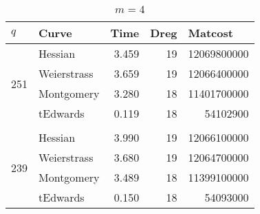 \begin{table}[!h]
\centering
\caption{$m=4$}
\label{tb:m=4}
\begin{tabular}{llrrr}
\hline
\multicolumn{1}{|l|}{$q$}                  & \multicolumn{1}{l|}{Curve}       & \multicolumn{1}{l|}{Time}  & \multicolumn{1}{l|}{Dreg} & \multicolumn{1}{l|}{Matcost}     \\ \hline
\multicolumn{1}{|l|}{\multirow{4}{*}{251}} & \multicolumn{1}{l|}{Hessian}     & \multicolumn{1}{r|}{3.459} & \multicolumn{1}{r|}{19}   & \multicolumn{1}{r|}{12069800000} \\ \cline{2-5} 
\multicolumn{1}{|l|}{}                     & \multicolumn{1}{l|}{Weierstrass} & \multicolumn{1}{r|}{3.659} & \multicolumn{1}{r|}{19}   & \multicolumn{1}{r|}{12066400000} \\ \cline{2-5} 
\multicolumn{1}{|l|}{}                     & \multicolumn{1}{l|}{Montgomery}  & \multicolumn{1}{r|}{3.280} & \multicolumn{1}{r|}{18}   & \multicolumn{1}{r|}{11401700000} \\ \cline{2-5} 
\multicolumn{1}{|l|}{}                     & \multicolumn{1}{l|}{tEdwards}    & \multicolumn{1}{r|}{0.119} & \multicolumn{1}{r|}{18}   & \multicolumn{1}{r|}{54102900}    \\ \hline \vspace{-3mm}
                                           &                                  &                            &                           &                                  \\ \hline
\multicolumn{1}{|l|}{\multirow{4}{*}{239}} & \multicolumn{1}{l|}{Hessian}     & \multicolumn{1}{r|}{3.990} & \multicolumn{1}{r|}{19}   & \multicolumn{1}{r|}{12066100000} \\ \cline{2-5} 
\multicolumn{1}{|l|}{}                     & \multicolumn{1}{l|}{Weierstrass} & \multicolumn{1}{r|}{3.680} & \multicolumn{1}{r|}{19}   & \multicolumn{1}{r|}{12064700000} \\ \cline{2-5} 
\multicolumn{1}{|l|}{}                     & \multicolumn{1}{l|}{Montgomery}  & \multicolumn{1}{r|}{3.489} & \multicolumn{1}{r|}{18}   & \multicolumn{1}{r|}{11399100000} \\ \cline{2-5} 
\multicolumn{1}{|l|}{}                     & \multicolumn{1}{l|}{tEdwards}    & \multicolumn{1}{r|}{0.150} & \multicolumn{1}{r|}{18}   & \multicolumn{1}{r|}{54093000}    \\ \hline
\end{tabular}
\end{table}